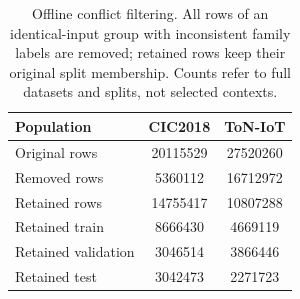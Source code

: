 \begin{table}[t]
\centering
\caption{Offline conflict filtering. All rows of an identical-input group with inconsistent family labels are removed; retained rows keep their original split membership. Counts refer to full datasets and splits, not selected contexts.}
\label{tab:quality}
\begin{tabular}{@{}l *{2}{S[table-format=8.0]}@{}}
\toprule
Population & {CIC2018} & {ToN-IoT} \\
\midrule
Original rows & 20115529 & 27520260 \\
Removed rows & 5360112 & 16712972 \\
Retained rows & 14755417 & 10807288 \\
Retained train & 8666430 & 4669119 \\
Retained validation & 3046514 & 3866446 \\
Retained test & 3042473 & 2271723 \\
\bottomrule
\end{tabular}
\end{table}
